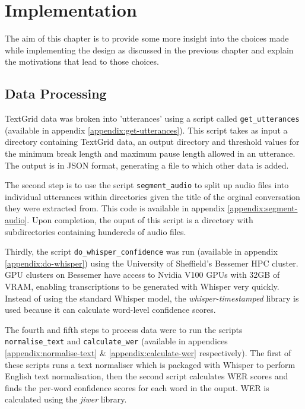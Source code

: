 \chapter{Implementation}\label{ch:implementation-and-testing}

The aim of this chapter is to provide some more insight into the choices made while implementing the design as discussed in the previous chapter and explain the motivations that lead to those choices.

\section{Data Processing}

TextGrid data was broken into 'utterances' using a script called \texttt{get\_utterances} (available in appendix \ref{appendix:get-utterances}).
This script takes as input a directory containing TextGrid data, an output directory and threshold values for the minimum break length and maximum pause length allowed in an utterance.
The output is in JSON format, generating a file to which other data is added.

The second step is to use the script \texttt{segment\_audio} to split up audio files into individual utterances within directories given the title of the orginal conversation they were extracted from.
This code is available in appendix \ref{appendix:segment-audio}.
Upon completion, the ouput of this script is a directory with subdirectories containing hundereds of audio files.

Thirdly, the script \texttt{do\_whisper\_confidence} was run (available in appendix \ref{appendix:do-whisper}) using the University of Sheffield's Bessemer HPC cluster\cite{shef-hpc}.
GPU clusters on Bessemer have access to Nvidia V100 GPUs with 32GB of VRAM, enabling transcriptions to be generated with Whisper very quickly.
Instead of using the standard Whisper model, the \emph{whisper-timestamped}\cite{whisper-timestamped} library is used because it can calculate word-level confidence scores.

The fourth and fifth steps to process data were to run the scripts \texttt{normalise\_text} and \texttt{calculate\_wer} (available in appendices \ref{appendix:normalise-text} \& \ref{appendix:calculate-wer} respectively).
The first of these scripts runs a text normaliser which is packaged with Whisper\cite{whisper} to perform English text normalisation, then the second script calculates WER scores and finds the per-word confidence scores for each word in the ouput.
WER is calculated using the \emph{jiwer}\cite{jiwer} library.

